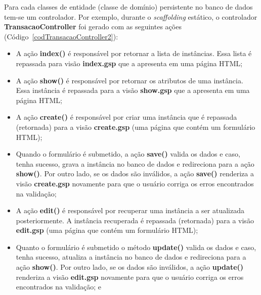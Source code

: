 Para cada classes de entidade (classe  de domínio) persistente no banco de dados
tem-se  um controlador.  Por exemplo,  durante o  {\it scaffolding}  estático, o
controlador  {\bf  TransacaoController}  foi   gerado  com  as  seguintes  ações
(Código~\ref{codTransacaoController2}):

\begin{itemize}

\vspace{0.3cm}

\item   A  ação  {\bf   index()}  é   responsável  por   retornar  a   lista  de
  instâncias. Essa lista é repassada  para visão {\bf index.gsp} que a apresenta
  em uma página HTML;

\vspace{0.3cm}

\item  A ação  {\bf  show()} é  responsável  por retornar  os  atributos de  uma
  instância.   Essa instância  é repassada  para a  visão {\bf  show.gsp}  que a
  apresenta em uma página HTML;

\vspace{0.3cm}

\item  A  ação {\bf  create()}  é  responsável por  criar  uma  instância que  é
  repassada (retornada) para a visão  {\bf create.gsp} (uma página que contém um
  formulário HTML);

\vspace{0.3cm}

\item Quando  o formulário é  submetido, a ação  {\bf save()} valida os  dados e
  caso, tenha sucesso, grava a instância  no banco de dados e redireciona para a
  ação {\bf  show()}.  Por outro  lado, se os  dados são inválidos, a  ação {\bf
    save()}  renderiza a  visão {\bf  create.gsp} novamente  para que  o usuário
  corriga os erros encontrados na validação;

\vspace{0.3cm}

\item  A ação  {\bf edit()}  é  responsável por  recuperar uma  instância a  ser
  atualizada  posteriormente.  A  instância recuperada  é  repassada (retornada)
  para a visão {\bf edit.gsp} (uma página que contém um formulário HTML);

\vspace{0.3cm}

\item Quanto o formulário é submetido  o método {\bf update()} valida os dados e
  caso, tenha sucesso, atualiza a instância no banco de dados e redireciona para
  a ação {\bf show()}.   Por outro lado, se os dados são  inválidos, a ação {\bf
    update()}  renderiza a  visão {\bf  edit.gsp} novamente  para que  o usuário
  corriga os erros encontrados na validação; e


\end{itemize}

